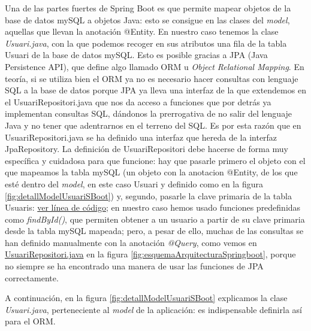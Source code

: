 \documentclass[a4paper,12pt]{report}
\begin{document}
				
				Una de las partes fuertes de Spring Boot es que permite mapear objetos de la base de datos mySQL a objetos Java: esto se consigue en las clases del \textit{model}, aquellas que llevan la anotación @Entity. En nuestro caso tenemos la clase \textit{Usuari.java}, con la que podemos recoger en sus atributos una fila de la tabla Usuari de la base de datos mySQL. Esto es posible gracias a JPA (Java Persistence API), que define algo llamado ORM u \textit{Object Relational Mapping}. En teoría, si se utiliza bien el ORM ya no es necesario hacer consultas con lenguaje SQL a la base de datos porque JPA ya lleva una interfaz de la que extendemos en el UsuariRepositori.java que nos da acceso a funciones que por detrás ya implementan consultas SQL, dándonos la prerrogativa de no salir del lenguaje Java y no tener que adentrarnos en el terreno del SQL. Es por esta razón que en UsuariRepositori.java se ha definido una interfaz que hereda de  la interfaz JpaRepository. La definición de UsuariRepositori debe hacerse de forma muy específica y cuidadosa para que funcione: hay que pasarle primero el objeto con el que mapeamos la tabla mySQL (un objeto con la anotacion @Entity, de los que esté dentro del \textit{model}, en este caso Usuari y definido como en la figura \ref{fig:detallModelUsuariSBoot}) y, segundo, pasarle la clave primaria de la tabla Usuaris: \href{https://github.com/blackcub3s/mercApp/blob/69c9dffc3a959f9b19b43eaf13236ba99250878e/APP%20WEB/__springboot__produccio__/app/src/main/java/miApp/app/Usuaris/repositori/UsuariRepositori.java#L21}{ver línea de código}; en nuestro caso hemos usado funciones predefinidas como \textit{findById()}, que permiten obtener a un usuario a partir de su clave primaria desde la tabla mySQL mapeada; pero, a pesar de ello, muchas de las consultas se han definido manualmente con la anotación \textit{@Query}, como vemos en \href{https://github.com/blackcub3s/mercApp/blob/main/APP%20WEB/__springboot__produccio__/app/src/main/java/miApp/app/Usuaris/repositori/UsuariRepositori.java}{UsuariRepositori.java} en la figura \ref{fig:esquemaArquitecturaSpringboot}, porque no siempre se ha encontrado una manera de usar las funciones de JPA correctamente.
				
				A continuación, en la figura \ref{fig:detallModelUsuariSBoot} explicamos la clase \textit{Usuari.java}, perteneciente al \textit{model} de la aplicación: es indispensable definirla así para el ORM.
				
				
\end{document}
